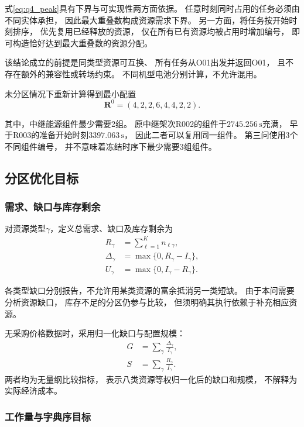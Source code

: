 \documentclass[bwprint]{gmcmthesis}
\begin{document}
式\eqref{eq:q4_peak}具有下界与可实现性两方面依据。
任意时刻同时占用的任务必须由不同实体承担，
因此最大重叠数构成资源需求下界。
另一方面，将任务按开始时刻排序，
优先复用已经释放的资源，
仅在所有已有资源均被占用时增加编号，
即可构造恰好达到最大重叠数的资源分配。

该结论成立的前提是同类型资源可互换、
所有任务从O01出发并返回O01，
且不存在额外的兼容性或转场约束。
不同机型电池分别计算，不允许混用。

未分区情况下重新计算得到最小配置
\begin{equation}
\boldsymbol{R}^{0}=(4,2,2,6,4,4,2,2).
\end{equation}

其中，中继能源组件最少需要2组。
原中继架次R002的组件于$2745.256\,\mathrm{s}$充满，
早于R003的准备开始时刻$3397.063\,\mathrm{s}$，
因此二者可以复用同一组件。
第三问使用3个不同组件编号，
并不意味着冻结时序下最少需要3组组件。

\subsection{分区优化目标}

\subsubsection{需求、缺口与库存剩余}

对资源类型$\gamma$，定义总需求、缺口及库存剩余为
\begin{align}
R_\gamma&=\sum_{\ell=1}^{K}n_{\ell\gamma},\\
\Delta_\gamma&=\max\{0,R_\gamma-I_\gamma\},\\
U_\gamma&=\max\{0,I_\gamma-R_\gamma\}.
\end{align}

各类型缺口分别报告，不允许用某类资源的富余抵消另一类短缺。
由于本问需要分析资源缺口，
库存不足的分区仍参与比较，
但须明确其执行依赖于补充相应资源。

无采购价格数据时，采用归一化缺口与配置规模：
\begin{align}
G&=\sum_{\gamma}\frac{\Delta_\gamma}{I_\gamma},\\
S&=\sum_{\gamma}\frac{R_\gamma}{I_\gamma}.
\end{align}
两者均为无量纲比较指标，
表示八类资源等权归一化后的缺口和规模，
不解释为实际经济成本。

\subsubsection{工作量与字典序目标}
\end{document}
